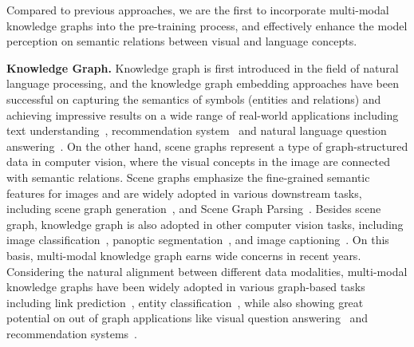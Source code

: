 Compared to previous approaches, we are the first to incorporate multi-modal knowledge graphs into the pre-training process, and effectively enhance the model perception on semantic relations between visual and language concepts.

\textbf{Knowledge Graph.} Knowledge graph is first introduced in the field of natural language processing, and the knowledge graph embedding approaches have been successful on capturing the semantics of symbols (entities and relations) and achieving impressive results on a wide range of real-world applications including text understanding~\cite{textunder2,textunder1}, recommendation system~\cite{recommand2,recommand1} and natural language question answering~\cite{kgqa, kgqa2}. On the other hand, scene graphs represent a type of graph-structured data in computer vision, where the visual concepts in the image are connected with semantic relations. Scene graphs emphasize the fine-grained semantic features for images and are widely adopted in various downstream tasks, including scene graph generation~\cite{sggen}, and Scene Graph Parsing~\cite{sgparse}. Besides scene graph, knowledge graph is also adopted in other computer vision tasks, including image classification~\cite{graphcls}, panoptic segmentation~\cite{graphseg}, and image captioning~\cite{graphcap}.
On this basis, multi-modal knowledge graph earns wide concerns in recent years. Considering the natural alignment between different data modalities, multi-modal knowledge graphs have been widely adopted in various graph-based tasks including link prediction~\cite{link1, link2}, entity classification~\cite{entity1}, while also showing great potential on out of graph applications like visual question answering~\cite{gvqa1,gvqa2} and recommendation systems~\cite{grecommand1,grecommand2}.